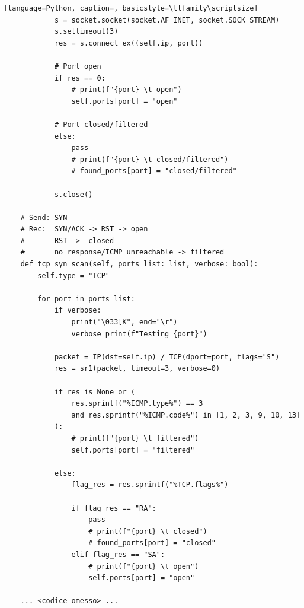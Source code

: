 \documentclass[12pt]{report}
\begin{document}
\begin{lstlisting}[language=Python, caption=, basicstyle=\ttfamily\scriptsize]
            s = socket.socket(socket.AF_INET, socket.SOCK_STREAM)
            s.settimeout(3)
            res = s.connect_ex((self.ip, port))

            # Port open
            if res == 0:
                # print(f"{port} \t open")
                self.ports[port] = "open"

            # Port closed/filtered
            else:
                pass
                # print(f"{port} \t closed/filtered")
                # found_ports[port] = "closed/filtered"

            s.close()

    # Send: SYN
    # Rec:  SYN/ACK -> RST -> open
    #       RST ->  closed
    #       no response/ICMP unreachable -> filtered
    def tcp_syn_scan(self, ports_list: list, verbose: bool):
        self.type = "TCP"

        for port in ports_list:
            if verbose:
                print("\033[K", end="\r")
                verbose_print(f"Testing {port}")

            packet = IP(dst=self.ip) / TCP(dport=port, flags="S")
            res = sr1(packet, timeout=3, verbose=0)

            if res is None or (
                res.sprintf("%ICMP.type%") == 3
                and res.sprintf("%ICMP.code%") in [1, 2, 3, 9, 10, 13]
            ):
                # print(f"{port} \t filtered")
                self.ports[port] = "filtered"

            else:
                flag_res = res.sprintf("%TCP.flags%")

                if flag_res == "RA":
                    pass
                    # print(f"{port} \t closed")
                    # found_ports[port] = "closed"
                elif flag_res == "SA":
                    # print(f"{port} \t open")
                    self.ports[port] = "open"

    ... <codice omesso> ...
\end{lstlisting}
\end{document}
